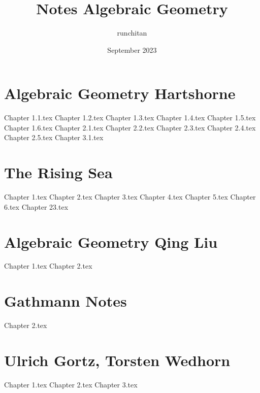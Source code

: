 \documentclass{article}
\title{Notes Algebraic Geometry}
\author{runchitan }
\date{September 2023}
\begin{document}

\tableofcontents

\newpage\part{Algebraic Geometry Hartshorne}
{Chapter 1.1.tex}
{Chapter 1.2.tex}
{Chapter 1.3.tex}
{Chapter 1.4.tex}
{Chapter 1.5.tex}
{Chapter 1.6.tex}
{Chapter 2.1.tex}
{Chapter 2.2.tex}
{Chapter 2.3.tex}
{Chapter 2.4.tex}
{Chapter 2.5.tex}
{Chapter 3.1.tex}

\newpage\part{The Rising Sea}
{Chapter 1.tex}
{Chapter 2.tex}
{Chapter 3.tex}
{Chapter 4.tex}
{Chapter 5.tex}
{Chapter 6.tex}
{Chapter 23.tex}

\newpage\part{Algebraic Geometry Qing Liu}
{Chapter 1.tex}
{Chapter 2.tex}

\newpage\part{Gathmann Notes}
{Chapter 2.tex}

\newpage\part{Ulrich Gortz, Torsten Wedhorn}
{Chapter 1.tex}
{Chapter 2.tex}
{Chapter 3.tex}

\newpage


\end{document}
